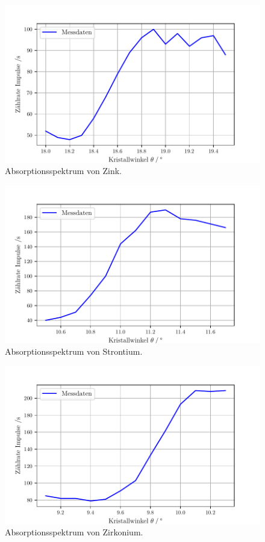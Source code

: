 \begin{figure}[H]
  \centering
  \includegraphics[width=\textwidth]{build/plot3.pdf}
  \caption{Absorptionsspektrum von Zink.}
  \label{fig:plot3}
\end{figure}

\begin{figure}[H]
  \centering
  \includegraphics[width=\textwidth]{build/plot4.pdf}
  \caption{Absorptionsspektrum von Strontium.}
  \label{fig:plot4}
\end{figure}

\begin{figure}[H]
  \centering
  \includegraphics[width=\textwidth]{build/plot5.pdf}
  \caption{Absorptionsspektrum von Zirkonium.}
  \label{fig:plot5}
\end{figure}

